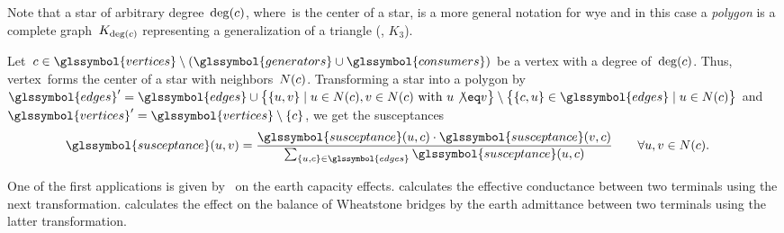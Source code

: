 Note that a star of arbitrary degree~$\deg(c)$, where~\vertexStar is
the center of a star, is a more general notation for wye and in this case a
\emph{polygon} is a complete graph~$K_{\deg(c)}$ representing a
generalization of a triangle (\ie, $K_3$).
% 
%  
\begin{reductionrule}
    Let~$\vertexStar\in\glssymbol{vertices}\setminus(\glssymbol{generators}\cup
    \glssymbol{consumers})$ be a vertex with a degree of~$\operatorname{deg}(c)$.
    Thus, vertex~\vertexStar forms the center of a star with
    neighbors~$N(c)$. Transforming a star into a polygon
    by~$
        \glssymbol{edges}'
        =
        \glssymbol{edges}
        \cup
        \big\{
            \{\vertexa,\vertexb\}
            \mid
            \vertexa 
            \in
            \neighbor(\vertexStar), 
            \vertexb 
            \in
            \neighbor(\vertexStar)~\text{with}~\vertexa
            \not\eq
            \vertexb
        \big\}
        \setminus
        \big\{
            \{\vertexStar,\vertexa\}
            \in
            \glssymbol{edges}
            \mid
            \vertexa
            \in
            \neighbor(\vertexStar)
        \big\}
    $
    and~$
        \glssymbol{vertices}' 
        = 
        \glssymbol{vertices}
        \setminus
        \{\vertexStar\}
    $, we get the susceptances
    \begin{align}
        \glssymbol{susceptance}(\vertexa,\vertexb) 
        &= 
        \frac{
        \glssymbol{susceptance}(\vertexa,\vertexStar)
        \cdot
        \glssymbol{susceptance}(\vertexb,\vertexStar)
        }{
            \sum_{
                \{\vertexa,\vertexStar\}
                \in
                \glssymbol{edges}
            }
            \glssymbol{susceptance}(\vertexa,\vertexStar)
        }
        \qquad
        \forall
        \vertexa,\vertexb
        \in
        \neighbor(\vertexStar).%
    \end{align}
    \label{ch:network-analyzes:sec:mathematical-model:sim:star-polygon-transformation}
\end{reductionrule}
% 
One of the first applications is given by~\textcite{But21} on the earth capacity
effects. \textcite[p.917; Figure 3]{Ros24} calculates the effective conductance
between two terminals using the next transformation. \textcite[p.917; Figure
4]{Ros24} calculates the effect on the balance of Wheatstone bridges by the
earth admittance between two terminals using the latter transformation.%

